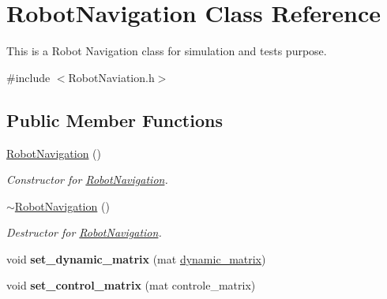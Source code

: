 \hypertarget{class_robot_navigation}{}\section{Robot\+Navigation Class Reference}
\label{class_robot_navigation}


This is a Robot Navigation class for simulation and tests purpose.  




{\ttfamily \#include $<$Robot\+Naviation.\+h$>$}

\subsection*{Public Member Functions}
\begin{DoxyCompactItemize}
\item 
\mbox{\label{class_robot_navigation_a949517ad58b54558b5e97fb7154f185b}} 
\hyperlink{class_robot_navigation_a949517ad58b54558b5e97fb7154f185b}{Robot\+Navigation} ()
\begin{DoxyCompactList}\small\item\em Constructor for \hyperlink{class_robot_navigation}{Robot\+Navigation}. \end{DoxyCompactList}\item 
\mbox{\label{class_robot_navigation_af29a5bb696c20ee7c8ced94f2c33b893}} 
\hyperlink{class_robot_navigation_af29a5bb696c20ee7c8ced94f2c33b893}{$\sim$\+Robot\+Navigation} ()
\begin{DoxyCompactList}\small\item\em Destructor for \hyperlink{class_robot_navigation}{Robot\+Navigation}. \end{DoxyCompactList}\item 
\mbox{\label{class_robot_navigation_aaed78c0f698c9f29760979b654caa162}} 
void {\bfseries set\+\_\+dynamic\+\_\+matrix} (mat \hyperlink{class_robot_navigation_a1aad778b34e54f7fc85ec3ed744a444c}{dynamic\+\_\+matrix})
\item 
\mbox{\label{class_robot_navigation_a3c82191207173bcd52cec1ccf7d6e16c}} 
void {\bfseries set\+\_\+control\+\_\+matrix} (mat controle\+\_\+matrix)
\item 
\mbox{\label{class_robot_navigation_a691f4f615b422d3a9dfa2e9b6a24f8e2}} 

\end{DoxyCompactItemize}
